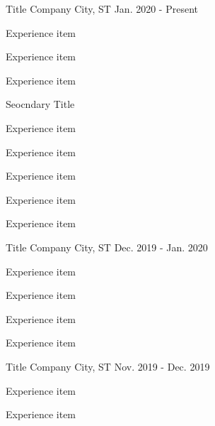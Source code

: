 

\begin{cventries}


  \cventry
    {Title} %
    {Company} %
    {City, ST} %
    {Jan. 2020 - Present} %
    {
      \begin{cvitems} %
        \item {Experience item}
        \item {Experience item}
        \item {Experience item}
      \end{cvitems}
    }

  \cventry
    {Seocndary Title} %
    {}{}{}
    {
      \begin{cvitems} %
        \item {Experience item}
        \item {Experience item}
        \item {Experience item}
        \item {Experience item}
        \item {Experience item}
      \end{cvitems}
    }

  \cventry
    {Title} %
    {Company} %
    {City, ST} %
    {Dec. 2019 - Jan. 2020} %
    {
      \begin{cvitems} %
        \item {Experience item}
        \item {Experience item}
        \item {Experience item}
        \item {Experience item}
      \end{cvitems}
    }

  \cventry
    {Title} %
    {Company} %
    {City, ST} %
    {Nov. 2019 - Dec. 2019} %
    {
      \begin{cvitems} %
        \item {Experience item}
        \item {Experience item}
      \end{cvitems}
    }


\end{cventries}
